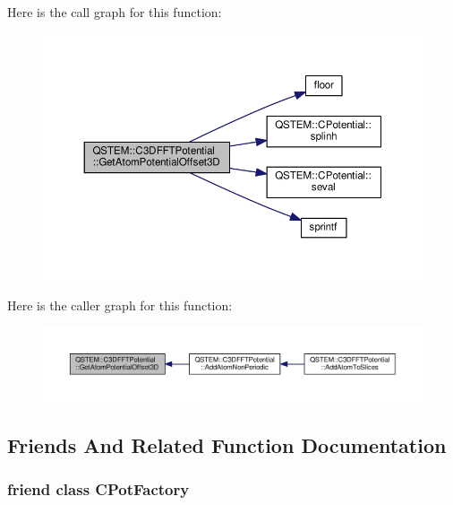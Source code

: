 Here is the call graph for this function\-:
\nopagebreak
\begin{figure}[H]
\begin{center}
\leavevmode
\includegraphics[width=350pt]{class_q_s_t_e_m_1_1_c3_d_f_f_t_potential_ab70512e29ee2d7b7594837fd3aa3cf5e_cgraph}
\end{center}
\end{figure}




Here is the caller graph for this function\-:
\nopagebreak
\begin{figure}[H]
\begin{center}
\leavevmode
\includegraphics[width=350pt]{class_q_s_t_e_m_1_1_c3_d_f_f_t_potential_ab70512e29ee2d7b7594837fd3aa3cf5e_icgraph}
\end{center}
\end{figure}




\subsection{Friends And Related Function Documentation}
\hypertarget{class_q_s_t_e_m_1_1_c3_d_f_f_t_potential_a6759f7ccac4d3744ec78fd194903e752}{
\subsubsection[{C\-Pot\-Factory}]{\setlength{\rightskip}{0pt plus 5cm}friend class {\bf C\-Pot\-Factory}\hspace{0.3cm}{\ttfamily [friend]}}}\label{class_q_s_t_e_m_1_1_c3_d_f_f_t_potential_a6759f7ccac4d3744ec78fd194903e752}


